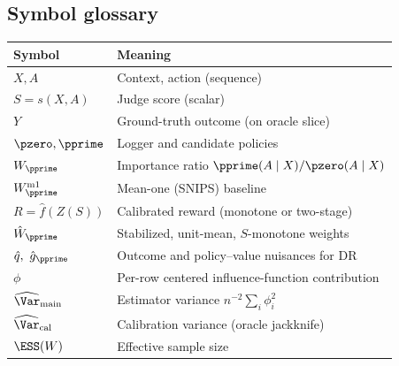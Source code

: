 \subsection{Symbol glossary}
\label{app:glossary}
\begin{center}
\begin{tabular}{ll}
\toprule
Symbol & Meaning \\
\midrule
$X,A$ & Context, action (sequence) \\
$S=s(X,A)$ & Judge score (scalar) \\
$Y$ & Ground-truth outcome (on oracle slice) \\
$\pzero,\pprime$ & Logger and candidate policies \\
$W_{\pprime}$ & Importance ratio $\pprime(A\mid X)/\pzero(A\mid X)$ \\
$W^{\mathrm{m1}}_{\pprime}$ & Mean-one (SNIPS) baseline \\
$R=\hat f(Z(S))$ & Calibrated reward (monotone or two-stage) \\
$\hat W_{\pprime}$ & Stabilized, unit-mean, $S$-monotone weights \\
$\hat q,\ \hat g_{\pprime}$ & Outcome and policy–value nuisances for DR \\
$\phi$ & Per-row centered influence-function contribution \\
$\widehat{\Var}_{\mathrm{main}}$ & Estimator variance $n^{-2}\sum_i\phi_i^2$ \\
$\widehat{\Var}_{\mathrm{cal}}$ & Calibration variance (oracle jackknife) \\
$\ESS(W)$ & Effective sample size \\
\bottomrule
\end{tabular}
\end{center}
